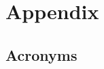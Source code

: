 \onecolumn

\section*{Appendix}
\label{appendix}




\nocite{*}

\subsection*{Acronyms}


\printglossaries

